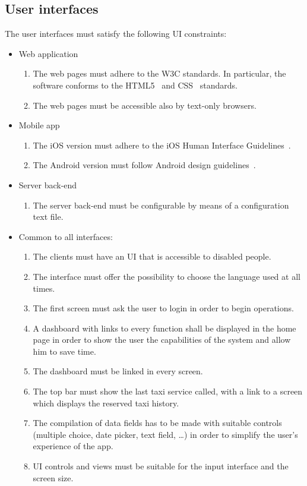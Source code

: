 \subsection{User interfaces}

The user interfaces must satisfy the following UI constraints:
\begin{itemize}
    \item Web application
        \begin{enumerate}
        \item The web pages must adhere to the W3C standards. In particular, the software conforms to the HTML5~\cite{w3c-html5} and CSS~\cite{w3c-css} standards.
        \item The web pages must be accessible also by text-only browsers.
        \end{enumerate}
    \item Mobile app
        \begin{enumerate}
        	\item The iOS version must adhere to the iOS Human Interface Guidelines~\cite{apple-ios-hig}.
	\item The Android version must follow Android design guidelines~\cite{google-android-hig}.
        \end{enumerate}
     \item Server back-end
     	\begin{enumerate}
		\item The server back-end must be configurable by means of a configuration text file.
	\end{enumerate}
    \item Common to all interfaces:
    \begin{enumerate}
        \item The clients must have an UI that is accessible to disabled people.
        \item The interface must offer the possibility to choose the language used at all times.
        \item The first screen must ask the user to login in order to begin operations.
        \item A dashboard with links to every function shall be displayed in the home page in order to show the user the capabilities of the system and allow him to save time.
        \item The dashboard must be linked in every screen.
        \item The top bar must show the last taxi service called, with a link to a screen which displays the reserved taxi history.
        \item The compilation of data fields has to be made with suitable controls (multiple choice, date picker, text field, \ldots) in order to simplify the user's experience of the app.
        \item UI controls and views must be suitable for the input interface and the screen size.
    \end{enumerate}
\end{itemize}

